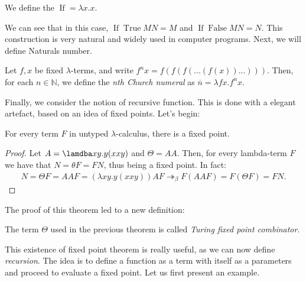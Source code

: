 \begin{definition}
  We define the $\operatorname{If} = \lambda x.x$.  
\end{definition}

We can see that in this case, $\operatorname{If} \operatorname{True} M N = M$ and $\operatorname{If} \operatorname{False} M N = N$. This construction is very natural and widely used in computer programs. Next, we will define Naturals number. 

\begin{definition} \label{def:untyped-natural} 
Let $f,x$ be fixed $\lambda$-terms, and write $f^nx = f(f(f(...(f(x))...)))$. Then, for each $n \in \mathbb N$, we define the \emph{nth Church numeral} as $\overline n=\lambda fx.f^nx$.
\end{definition}

Finally, we consider the notion of recursive function. This is done with a elegant artefact, based on an idea of fixed points. Let's begin:



\begin{theorem}
  For every term $F$ in untyped $\lambda$-calculus, there is a fixed point.
\end{theorem}
\begin{proof}
  Let $A=\lamdba xy.y(xxy)$ and $\Theta =AA$. Then, for every lambda-term $F$ we have that $N=\theta F = FN$, thus being a fixed point. In fact:
  \begin{align*}
    N = \Theta F = AAF = (\lambda xy.y(xxy))AF \twoheadrightarrow_\beta F(AAF) = F(\Theta F) = FN.
  \end{align*}
\end{proof}
The proof of this theorem led to a new definition:

\begin{definition}
  The term $\Theta$ used in the previous theorem is called \emph{Turing fixed point combinator}.
\end{definition}

This existence of fixed point theorem is really useful, as we can now define \emph{recursion}. The idea is to define a function as a term with itself as a parameters and proceed to evaluate a fixed point. Let us first present an example.

